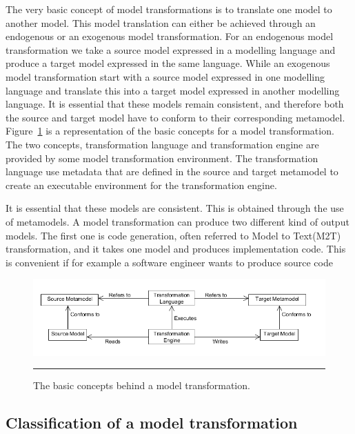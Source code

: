 The very basic concept of model transformations is to translate one model to
another model. This model translation can either be achieved through an
endogenous or an exogenous model transformation. For an endogenous model
transformation we take a source model expressed in a modelling language and
produce a target model expressed in the same language. While an exogenous model
transformation start with a source model expressed in one modelling language and
translate this into a target model expressed in another modelling language. It
is essential that these models remain consistent, and therefore both the source
and target model have to conform to their corresponding metamodel.
Figure~\ref{fig:BasicTransformation} is a representation of the basic concepts
for a model transformation. The two concepts, transformation language and
transformation engine are provided by some model transformation environment.
The transformation language use metadata that are defined in the source and
target metamodel to create an executable environment for the transformation
engine. 

It is essential that these models are consistent. This is
obtained through the use of metamodels.
A model transformation can produce two different kind of output models. The
first one is code generation, often referred to Model to Text(M2T)
transformation, and it takes one model and produces implementation code. This
is convenient if for example a software engineer wants to produce source code

\begin{figure}[H]
  \centering
    \includegraphics[scale=0.5]{./Figures/BasicTransformation.png}
    \rule{35em}{0.5pt}
  \caption[Basic Model Transformation]
  				{The basic concepts behind a model
  transformation.}
  \label{fig:BasicTransformation}
\end{figure}


\subsection{Classification of a model transformation}


